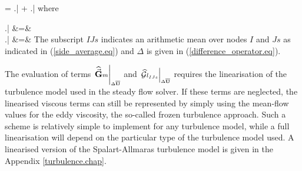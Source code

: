 %
\beq
   =
      \left.\right|\sm{\overline{\mu}} +
      \left.\right|
  \label{linear_viscous_split.eq}
\eeq
%
 where

%
\beq
 \left.\right|\sm{\overline{\mu}}
 &=&  
 \label{linear_laplacian_1.eq}\\
 \left.\right|
 &=& \frac{1}{Re} 
 \label{linear_laplacian_2.eq}
\eeq
%
 The subscript $IJs$ indicates an arithmetic mean over nodes $I$ and $Js$
 as indicated in (\ref{side_average.eq}) and $\Delta$ is given in 
 (\ref{difference_operator.eq}).

 The evaluation of terms $\left.\widehat{\vec{\bf G}}{\scriptstyle m}\right|_{\mbox{\tiny $\Delta\overline{\bf U}$}}$
 and $ \left.\widehat{\cal G}{\scriptstyle l}_{\mbox{\tiny $IJs$}}\right|_{\mbox{\tiny $\Delta\overline{\bf U}$}}$ requires
 the linearisation of the turbulence model used
 in the steady flow solver.
 If these terms are neglected, the linearised viscous terms can still be represented by
 simply using the mean-flow values for the eddy viscosity,
 the so-called frozen turbulence approach.
 Such a scheme is relatively simple to implement for any turbulence model,
 while a full linearisation will depend on the particular type of
 the turbulence model used.
 A linearised version of the Spalart-Allmaras \citeyear{Spalart:1} turbulence
 model is given in the Appendix \ref{turbulence.chap}.
%
%
